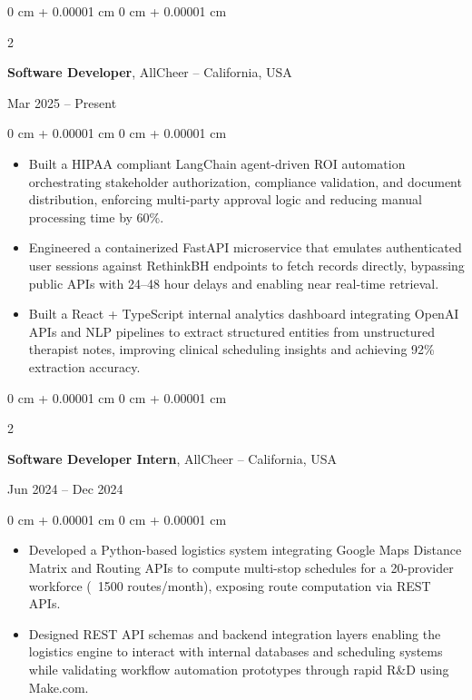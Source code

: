 \documentclass[10pt, letterpaper]{article}
\newenvironment{highlights}{
    \begin{itemize}[
        topsep=0.10 cm,
        parsep=0.10 cm,
        partopsep=0pt,
        itemsep=0pt,
        leftmargin=0 cm + 10pt
    ]
}{
    \end{itemize}
} %
\newenvironment{onecolentry}{
    \begin{adjustwidth}{
        0 cm + 0.00001 cm
    }{
        0 cm + 0.00001 cm
    }
}{
    \end{adjustwidth}
} %
\newenvironment{twocolentry}[2][]{
    \onecolentry
    \def\secondColumn{#2}
    \setcolumnwidth{\fill, 4.5 cm}
    \begin{paracol}{2}
}{
    \switchcolumn \raggedleft \secondColumn
    \end{paracol}
    \endonecolentry
} %
\renewenvironment{highlights}{
    \begin{itemize}[
        topsep=0.05cm,
        parsep=0.10cm,
        partopsep=1pt,
        itemsep=0pt,
        leftmargin=0cm + 10pt
    ]
}{
    \end{itemize}
}
\begin{document}
\begin{twocolentry}{Mar 2025 – Present}
\textbf{Software Developer}, AllCheer -- California, USA
\end{twocolentry}
\vspace{0.05cm}
\begin{onecolentry}
\begin{highlights}
\item Built a HIPAA compliant LangChain agent-driven ROI automation orchestrating stakeholder authorization, compliance validation, and document distribution, enforcing multi-party approval logic and reducing manual processing time by 60\%.
\item Engineered a containerized FastAPI microservice that emulates authenticated user sessions against RethinkBH endpoints to fetch records directly, bypassing public APIs with 24--48 hour delays and enabling near real-time retrieval.
\item Built a React + TypeScript internal analytics dashboard integrating OpenAI APIs and NLP pipelines to extract structured entities from unstructured therapist notes, improving clinical scheduling insights and achieving 92\% extraction accuracy.
\end{highlights}
\end{onecolentry}

\vspace{0.3cm}

\begin{twocolentry}{Jun 2024 – Dec 2024}
\textbf{Software Developer Intern}, AllCheer -- California, USA
\end{twocolentry}
\vspace{0.05cm}
\begin{onecolentry}
\begin{highlights}
\item Developed a Python-based logistics system integrating Google Maps Distance Matrix and Routing APIs to compute multi-stop schedules for a 20-provider workforce (~1500 routes/month), exposing route computation via REST APIs.
\item Designed REST API schemas and backend integration layers enabling the logistics engine to interact with internal databases and scheduling systems while validating workflow automation prototypes through rapid R\&D using Make.com.
\end{highlights}
\end{onecolentry}

\vspace{0.3cm}
\end{document}
